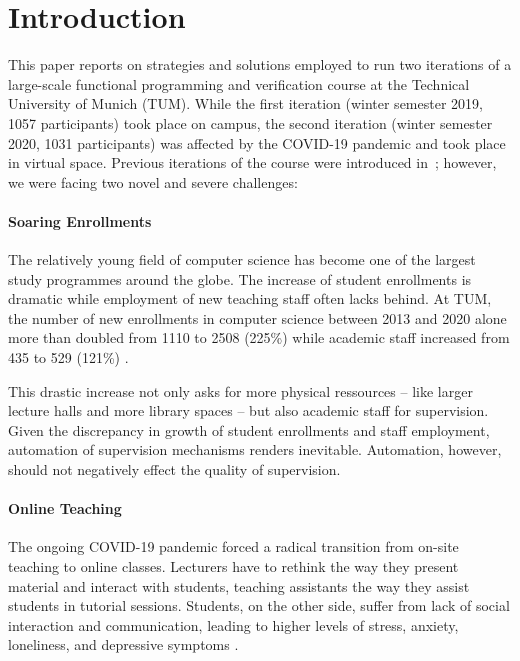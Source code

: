 \section{Introduction}

This paper reports on strategies and solutions employed to
run two iterations of a large-scale functional programming and verification course at the Technical University of Munich (TUM).
While the first iteration (winter semester 2019, 1057  participants)
took place on campus,
the second iteration (winter semester 2020, 1031 participants) was affected by the COVID-19 pandemic and took place in virtual space.
Previous iterations of the course were introduced in~\citep{next_1100};
however, we were facing two novel and severe challenges:

\paragraph{Soaring Enrollments}
The relatively young field of computer science has
become one of the largest study programmes around the globe.
The increase of student enrollments is dramatic
\citep{comp_sci_growth1,comp_sci_growth2}
while employment of new teaching staff often lacks behind.
At TUM, the number of new enrollments in computer science between 2013 and 2020 alone
more than doubled from 1110 to 2508 (225\%)
while academic staff increased from 435 to 529 (121\%) \citep{tum_numbers}.

This drastic increase not only asks for more physical ressources -- like larger lecture halls and more library spaces --
but also academic staff for supervision.
Given the discrepancy in growth of student enrollments and staff employment,
automation of supervision mechanisms renders inevitable.
Automation, however, should not
negatively effect the quality of supervision.

\paragraph{Online Teaching}
The ongoing COVID-19 pandemic forced a radical
transition from on-site teaching to online classes.
Lecturers have to rethink the way they present material and interact with students,
teaching assistants the way they assist students in tutorial sessions.
Students, on the other side, suffer from lack of social interaction and communication, leading to higher
levels of stress, anxiety, loneliness, and depressive symptoms \citep{students_lockdown1}.

